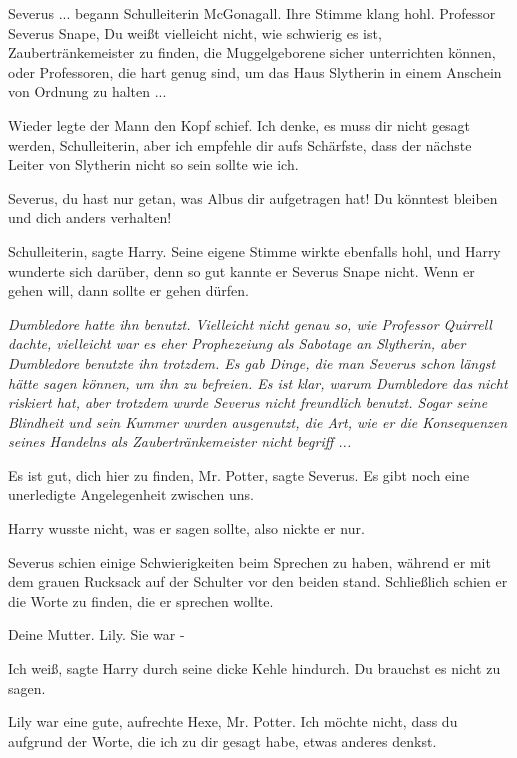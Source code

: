 \glqq{}Severus ...\grqq{} begann Schulleiterin McGonagall. Ihre Stimme klang hohl.
\glqq{}Professor Severus Snape, Du weißt vielleicht nicht, wie schwierig es ist,
Zaubertränkemeister zu finden, die Muggelgeborene sicher unterrichten können,
oder Professoren, die hart genug sind, um das Haus Slytherin in einem Anschein
von Ordnung zu halten ...\grqq{}

Wieder legte der Mann den Kopf schief. \glqq{}Ich denke, es muss dir nicht gesagt
werden, Schulleiterin, aber ich empfehle dir aufs Schärfste, dass der nächste
Leiter von Slytherin nicht so sein sollte wie ich.\grqq{}

\glqq{}Severus, du hast nur getan, was Albus dir aufgetragen hat! Du könntest
bleiben und dich anders verhalten!\grqq{}

\glqq{}Schulleiterin\grqq{}, sagte Harry. Seine eigene Stimme wirkte ebenfalls
hohl, und Harry wunderte sich darüber, denn so gut kannte er Severus Snape
nicht. \glqq{}Wenn er gehen will, dann sollte er gehen dürfen.\grqq{}

\emph{Dumbledore hatte ihn benutzt. Vielleicht nicht genau so, wie Professor
Quirrell dachte, vielleicht war es eher Prophezeiung als Sabotage an Slytherin,
aber Dumbledore benutzte ihn trotzdem. Es gab Dinge, die man Severus schon
längst hätte sagen können, um ihn zu befreien. Es ist klar, warum Dumbledore das
nicht riskiert hat, aber trotzdem wurde Severus nicht freundlich benutzt. Sogar
seine Blindheit und sein Kummer wurden ausgenutzt, die Art, wie er die
Konsequenzen seines Handelns als Zaubertränkemeister nicht begriff ...}

\glqq{}Es ist gut, dich hier zu finden, Mr. Potter\grqq{}, sagte Severus. \glqq{}
Es gibt noch eine unerledigte Angelegenheit zwischen uns.\grqq{}

Harry wusste nicht, was er sagen sollte, also nickte er nur.

Severus schien einige Schwierigkeiten beim Sprechen zu haben, während er mit dem
grauen Rucksack auf der Schulter vor den beiden stand. Schließlich schien er die
Worte zu finden, die er sprechen wollte.

\glqq{}Deine Mutter. Lily. Sie war -\grqq{}

\glqq{}Ich weiß\grqq{}, sagte Harry durch seine dicke Kehle hindurch. \glqq{}Du
brauchst es nicht zu sagen.\grqq{}

\glqq{}Lily war eine gute, aufrechte Hexe, Mr. Potter. Ich möchte nicht, dass du
aufgrund der Worte, die ich zu dir gesagt habe, etwas anderes denkst.\grqq{}

